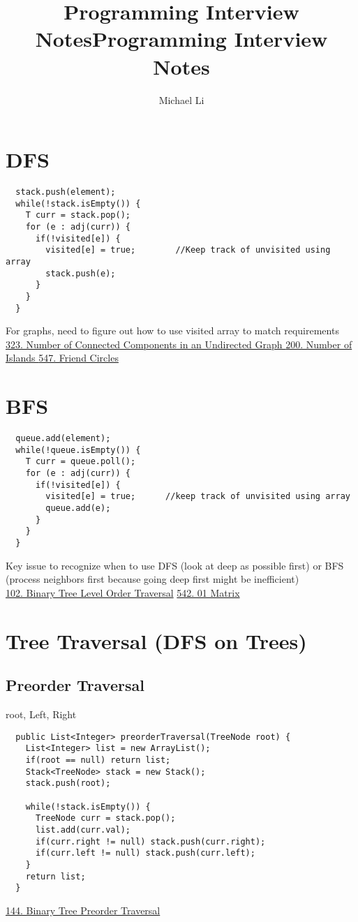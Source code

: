 \documentclass{article}
\title{Programming Interview Notes}
\date{}
\begin{document}
 
  \author{Michael Li}
  \title{Programming Interview Notes}
  \maketitle
  \tableofcontents
  \newpage
  \section{DFS}
  \begin{lstlisting}
  stack.push(element);
  while(!stack.isEmpty()) {
    T curr = stack.pop();
    for (e : adj(curr)) {
      if(!visited[e]) {
        visited[e] = true;        //Keep track of unvisited using array
        stack.push(e); 
      }
    }
  }
  \end{lstlisting}
  For graphs, need to figure out how to use visited array to match requirements\\
  \href{https://leetcode.com/problems/number-of-connected-components-in-an-undirected-graph/}{323. Number of Connected Components in an Undirected Graph
} \quad \href{https://leetcode.com/problems/number-of-islands/}{200. Number of Islands
} \quad \href{https://leetcode.com/problems/friend-circles/description/}{547. Friend Circles
}
  \section{BFS}
  \begin{lstlisting}
  queue.add(element);
  while(!queue.isEmpty()) {
    T curr = queue.poll();
    for (e : adj(curr)) {
      if(!visited[e]) {
        visited[e] = true;      //keep track of unvisited using array
        queue.add(e);
      }
    }
  }
  \end{lstlisting}
  Key issue to recognize when to use DFS (look at deep as possible first) or BFS (process neighbors first because going deep first might be inefficient)\\
  \href{https://leetcode.com/problems/binary-tree-level-order-traversal/}{102. Binary Tree Level Order Traversal} \quad \href{https://leetcode.com/problems/01-matrix/}{542. 01 Matrix}
  \section{Tree Traversal (DFS on Trees)}
  \subsection{Preorder Traversal}
  root, Left, Right
  \begin{lstlisting}
  public List<Integer> preorderTraversal(TreeNode root) {
    List<Integer> list = new ArrayList();
    if(root == null) return list;
    Stack<TreeNode> stack = new Stack();
    stack.push(root);
    
    while(!stack.isEmpty()) {
      TreeNode curr = stack.pop();
      list.add(curr.val);
      if(curr.right != null) stack.push(curr.right);
      if(curr.left != null) stack.push(curr.left);
    }
    return list;
  }
  \end{lstlisting}
  \href{https://leetcode.com/problems/binary-tree-preorder-traversal/}{144. Binary Tree Preorder Traversal}
\end{document}
